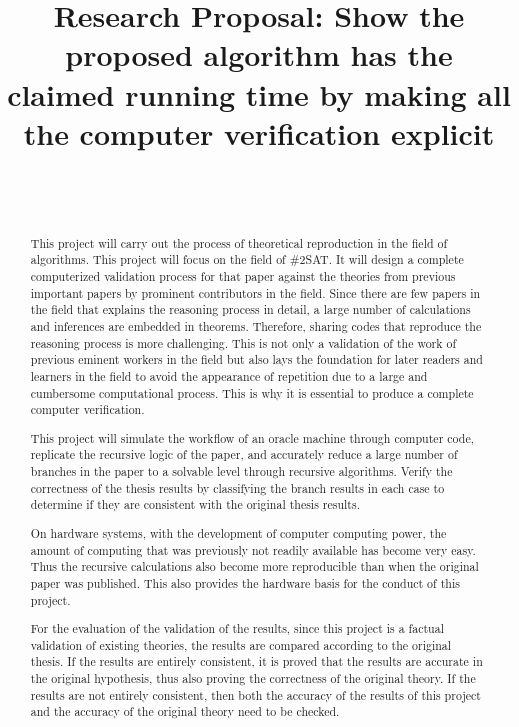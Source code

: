 \documentclass{sigchi}
\def\plaintitle{Research Proposal: Show the proposed algorithm has the claimed running time by making all the computer verification explicit}
\begin{document}
\title{\plaintitle}

\author{%
	\\
	\\
	
	
}

\maketitle

\begin{abstract}
  This project will carry out the process of theoretical reproduction in the field of algorithms. This project will focus on the field of \#2SAT. It will design a complete computerized validation process for that paper against the theories from previous important papers by prominent contributors in the field. Since there are few papers in the field that explains the reasoning process in detail, a large number of calculations and inferences are embedded in theorems. Therefore, sharing codes that reproduce the reasoning process is more challenging. This is not only a validation of the work of previous eminent workers in the field but also lays the foundation for later readers and learners in the field to avoid the appearance of repetition due to a large and cumbersome computational process. This is why it is essential to produce a complete computer verification.
  
  This project will simulate the workflow of an oracle machine through computer code, replicate the recursive logic of the paper, and accurately reduce a large number of branches in the paper to a solvable level through recursive algorithms. Verify the correctness of the thesis results by classifying the branch results in each case to determine if they are consistent with the original thesis results.
  
  On hardware systems, with the development of computer computing power, the amount of computing that was previously not readily available has become very easy. Thus the recursive calculations also become more reproducible than when the original paper was published. This also provides the hardware basis for the conduct of this project.
  
  For the evaluation of the validation of the results, since this project is a factual validation of existing theories, the results are compared according to the original thesis. If the results are entirely consistent, it is proved that the results are accurate in the original hypothesis, thus also proving the correctness of the original theory. If the results are not entirely consistent, then both the accuracy of the results of this project and the accuracy of the original theory need to be checked.
\end{abstract}
\end{document}
